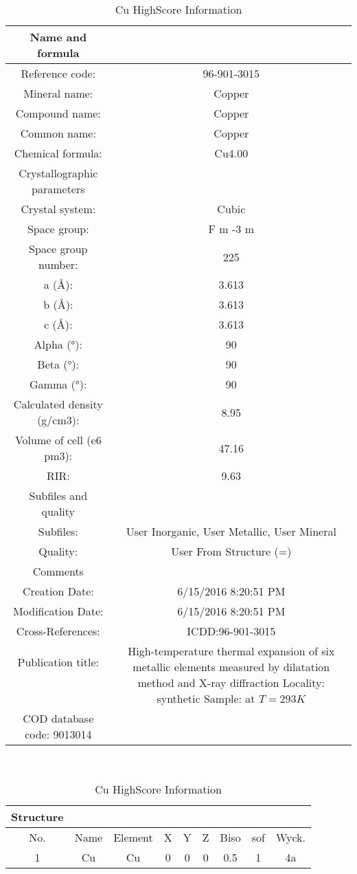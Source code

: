 \documentclass[11pt]{article}
\begin{document}
	\begin{table}[htbp]
		\centering
		\caption{Cu HighScore Information}
		\begin{tabular}{cc}
			\toprule
			Name and formula &  \\
			\midrule
			Reference code: & 96-901-3015 \\
			Mineral name: & Copper \\
			Compound name: & Copper \\
			Common name: & Copper \\
			Chemical formula: & Cu4.00 \\
			\midrule
			Crystallographic parameters &  \\
			\midrule
			Crystal system: & Cubic \\
			Space group: & F m -3 m \\
			Space group number: & 225 \\
			a (Å): & 3.613 \\
			b (Å): & 3.613 \\
			c (Å): & 3.613 \\
			Alpha (°): & 90 \\
			Beta (°): & 90 \\
			Gamma (°): & 90 \\
			Calculated density (g/cm3): & 8.95 \\
			Volume of cell (e6 pm3): & 47.16 \\
			RIR: & 9.63 \\
			\midrule
			Subfiles and quality &  \\
			\midrule
			Subfiles: & User Inorganic, User Metallic, User Mineral \\
			Quality: & User From Structure (=) \\
			Comments &  \\
			Creation Date: & 6/15/2016 8:20:51 PM \\
			Modification Date: & 6/15/2016 8:20:51 PM \\
			Cross-References: & ICDD:96-901-3015 \\
			Publication title: & \multirow{4}{*}{\parbox{7cm}{High-temperature thermal expansion of six metallic elements measured by dilatation method and X-ray diffraction  Locality: synthetic  Sample: at $T = 293 K$}} \\
			& \\
			& \\
			& \\
			COD database code: 9013014 &  \\
			\bottomrule
		\end{tabular}%
		\\
		\begin{tabular}{ccccccccc}
			\toprule
			Structure &   &   &   &   &   &   &   &  \\
			\midrule
			No. & Name & Element & X & Y & Z & Biso & sof & Wyck. \\
			\midrule
			1 & Cu & Cu & 0 & 0 & 0 & 0.5 & 1 & 4a \\
			\bottomrule
		\end{tabular}%
		\label{tab:Copper_Appendix}%
	\end{table}%
	
\end{document}
